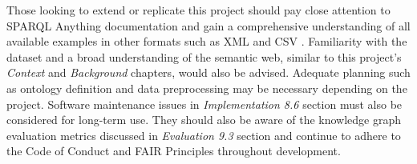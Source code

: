 Those looking to extend or replicate this project should pay close attention to SPARQL Anything \cite{sparqlanythinggithub} documentation and gain a comprehensive understanding of all available examples in other formats such as XML and CSV \cite{rattaknowledge}. Familiarity with the dataset and a broad understanding of the semantic web, similar to this project's \textit{Context} and \textit{Background} chapters, would also be advised. Adequate planning such as ontology definition and data preprocessing may be necessary depending on the project. Software maintenance issues in \textit{Implementation 8.6} section must also be considered for long-term use. They should also be aware of the knowledge graph evaluation metrics discussed in \textit{Evaluation 9.3} section and continue to adhere to the Code of Conduct \cite{bcs} and FAIR Principles \cite{fairprinciples} throughout development. 
